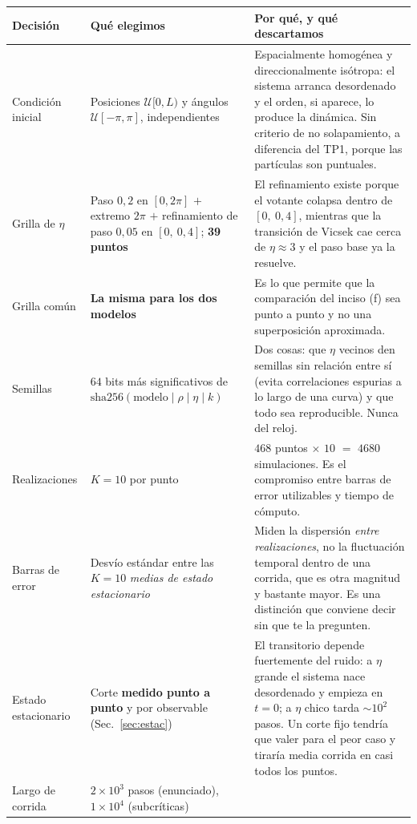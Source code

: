 \documentclass[11pt]{article}
\begin{document}
\begin{center}
\begin{tabular}{p{3.5cm}p{4.4cm}p{5.6cm}}
  \toprule
  Decisión & Qué elegimos & Por qué, y qué descartamos \\
  \midrule
  Condición inicial &
  Posiciones $\mathcal{U}[0,L)$ y ángulos $\mathcal{U}[-\pi,\pi]$, independientes &
  Espacialmente homogénea y direccionalmente isótropa: el sistema arranca desordenado y el orden, si aparece, lo produce la dinámica. Sin criterio de no solapamiento, a diferencia del TP1, porque las partículas son puntuales. \\
  \addlinespace
  Grilla de $\eta$ &
  Paso $0{,}2$ en $[0, 2\pi]$ $+$ extremo $2\pi$ $+$ refinamiento de paso $0{,}05$ en $[0,\ 0{,}4]$; \textbf{39 puntos} &
  El refinamiento existe porque el votante colapsa dentro de $[0,\ 0{,}4]$, mientras que la transición de Vicsek cae cerca de $\eta \approx 3$ y el paso base ya la resuelve. \\
  \addlinespace
  Grilla común &
  \textbf{La misma para los dos modelos} &
  Es lo que permite que la comparación del inciso (f) sea punto a punto y no una superposición aproximada. \\
  \addlinespace
  Semillas &
  $64$ bits más significativos de $\mathrm{sha256}(\text{modelo}\mid\rho\mid\eta\mid k)$ &
  Dos cosas: que $\eta$ vecinos den semillas sin relación entre sí (evita correlaciones espurias a lo largo de una curva) y que todo sea reproducible. Nunca del reloj. \\
  \addlinespace
  Realizaciones &
  $K = 10$ por punto &
  $468$ puntos $\times$ $10$ $=$ $4680$ simulaciones. Es el compromiso entre barras de error utilizables y tiempo de cómputo. \\
  \addlinespace
  Barras de error &
  Desvío estándar entre las $K = 10$ \emph{medias de estado estacionario} &
  Miden la dispersión \emph{entre realizaciones}, no la fluctuación temporal dentro de una corrida, que es otra magnitud y bastante mayor. Es una distinción que conviene decir sin que te la pregunten. \\
  \addlinespace
  Estado estacionario &
  Corte \textbf{medido punto a punto} y por observable (Sec.~\ref{sec:estac}) &
  El transitorio depende fuertemente del ruido: a $\eta$ grande el sistema nace desordenado y empieza en $t=0$; a $\eta$ chico tarda $\sim10^2$ pasos. Un corte fijo tendría que valer para el peor caso y tiraría media corrida en casi todos los puntos. \\
  \addlinespace
  Largo de corrida &
  $2\times10^3$ pasos (enunciado), $1\times10^4$ (subcríticas) &

\end{tabular}
\end{center}
\end{document}
